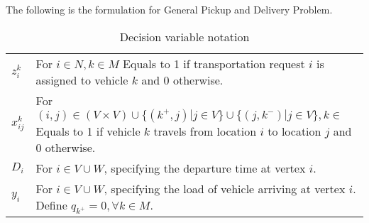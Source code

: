 

				The following is the formulation for General Pickup and Delivery Problem.

				\begin{table}[!htp]
					\centering
					\caption{Decision variable notation}
					\begin{tabular}{l p{5in}}
						\hline
						$z_i^k$ & For $i \in N, k \in M$ Equals to 1 if transportation request $i$ is assigned to vehicle $k$ and 0 otherwise. \\
						$x_{ij}^k$ & For $(i, j) \in (V \times V) \cup \{(k^+, j)| j \in V\} \cup \{(j, k^-)|j \in V\}, k \in $ Equals to 1 if vehicle $k$ travels from location $i$ to location $j$ and 0 otherwise.\\
						$D_i$ & For $i \in V\cup W$, specifying the departure time at vertex $i$.\\
						$y_i$ & For $i \in V\cup W$, specifying the load of vehicle arriving at vertex $i$. Define $q_{k^+} = 0, \forall k \in M$.\\
						\hline	
					\end{tabular}
				\end{table}

